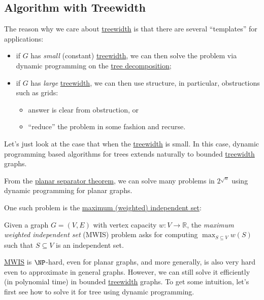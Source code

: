 \subsection{Algorithm with Treewidth}
The reason why we care about \hyperref[def:treewidth]{treewidth} is that there are several ``templates'' for applications:
\begin{itemize}
	\item if \(G\) has \emph{small} (constant) \hyperref[def:treewidth]{treewidth}, we can then solve the problem via dynamic programming on the \hyperref[def:tree-decomposition]{tree decomposition};
	\item if \(G\) has \emph{large} \hyperref[def:treewidth]{treewidth}, we can then use structure, in particular, obstructions such as grids:
	      \begin{itemize}
		      \item answer is clear from obstruction, or
		      \item ``reduce'' the problem in some fashion and recurse.
	      \end{itemize}
\end{itemize}

Let's just look at the case that when the \hyperref[def:treewidth]{treewidth} is small. In this case, dynamic programming based algorithms for trees extends naturally to bounded \hyperref[def:treewidth]{treewidth} graphs.

\begin{eg}
	From the \hyperref[eg:planar-separator-theorem]{planar separator theorem}, we can solve many problems in \(2^{\sqrt{n} }\) using dynamic programming for planar graphs.
\end{eg}

One such problem is the \hyperref[prb:MWIS]{maximum (weighted) independent set}:

\begin{problem}\label{prb:MWIS}
Given a graph \(G = (V, E)\) with vertex capacity \(w \colon V \to \mathbb{R} \), the \emph{maximum weighted independent set} (MWIS) problem asks for computing \(\max _{S \subseteq V} w(S)\) such that \(S \subseteq V\) is an independent set.
\end{problem}

\hyperref[prb:MWIS]{MWIS} is \(\NP\)-hard, even for planar graphs, and more generally, is also very hard even to approximate in general graphs. However, we can still solve it efficiently (in polynomial time) in bounded \hyperref[def:treewidth]{treewidth} graphs. To get some intuition, let's first see how to solve it for tree using dynamic programming.

